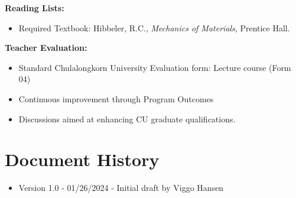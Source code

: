 \documentclass{article}
\begin{document}
\begin{enumerate}
\textbf{Reading Lists:}
\begin{itemize}
    \item Required Textbook: Hibbeler, R.C., \textit{Mechanics of Materials}, Prentice Hall.
\end{itemize}

\textbf{Teacher Evaluation:}
\begin{itemize}
    \item Standard Chulalongkorn University Evaluation form: Lecture course (Form 04)
    \item Continuous improvement through Program Outcomes
    \item Discussions aimed at enhancing CU graduate qualifications.
\end{itemize}
\end{enumerate}

\section*{Document History}
\begin{itemize}
    \item Version 1.0 - 01/26/2024 - Initial draft by Viggo Hansen
\end{itemize}
\end{document}
